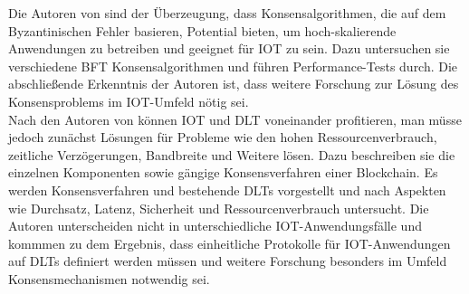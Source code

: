Die Autoren von \cite{Eval2018} sind der Überzeugung, dass Konsensalgorithmen, die auf dem Byzantinischen Fehler basieren, Potential bieten, um hoch-skalierende Anwendungen zu betreiben und geeignet für \ac{IOT} zu sein. Dazu untersuchen sie verschiedene \ac{BFT} Konsensalgorithmen und führen Performance-Tests durch. Die abschließende Erkenntnis der Autoren ist, dass weitere Forschung zur Lösung des Konsensproblems im \ac{IOT}-Umfeld nötig sei.\\
Nach den Autoren von \cite{convergence2019} können \ac{IOT} und \ac{DLT} voneinander profitieren, man müsse jedoch zunächst Lösungen für Probleme wie den hohen Ressourcenverbrauch, zeitliche Verzögerungen, Bandbreite und Weitere lösen. Dazu beschreiben sie die einzelnen Komponenten sowie gängige Konsensverfahren einer Blockchain. Es werden Konsensverfahren und bestehende \ac{DLT}s vorgestellt und nach Aspekten wie Durchsatz, Latenz, Sicherheit und Ressourcenverbrauch untersucht. Die Autoren unterscheiden nicht in unterschiedliche \ac{IOT}-Anwendungsfälle und kommmen zu dem Ergebnis, dass
einheitliche Protokolle für \ac{IOT}-Anwendungen auf \ac{DLT}s definiert werden müssen und weitere Forschung besonders im Umfeld Konsensmechanismen notwendig sei.
